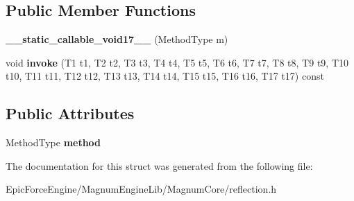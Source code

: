 \subsection*{Public Member Functions}
\begin{DoxyCompactItemize}
\item 
{\bfseries \+\_\+\+\_\+static\+\_\+callable\+\_\+void17\+\_\+\+\_\+} (Method\+Type m)\hypertarget{structagm_1_1reflection_1_1____static__callable__void17_____a3cccfe71a7d105334abec663010df20a}{}\label{structagm_1_1reflection_1_1____static__callable__void17_____a3cccfe71a7d105334abec663010df20a}

\item 
void {\bfseries invoke} (T1 t1, T2 t2, T3 t3, T4 t4, T5 t5, T6 t6, T7 t7, T8 t8, T9 t9, T10 t10, T11 t11, T12 t12, T13 t13, T14 t14, T15 t15, T16 t16, T17 t17) const \hypertarget{structagm_1_1reflection_1_1____static__callable__void17_____a746df7f3254e482cb4a74265a91e80c7}{}\label{structagm_1_1reflection_1_1____static__callable__void17_____a746df7f3254e482cb4a74265a91e80c7}

\end{DoxyCompactItemize}
\subsection*{Public Attributes}
\begin{DoxyCompactItemize}
\item 
Method\+Type {\bfseries method}\hypertarget{structagm_1_1reflection_1_1____static__callable__void17_____adec60407394a1af3d850764330d2bedf}{}\label{structagm_1_1reflection_1_1____static__callable__void17_____adec60407394a1af3d850764330d2bedf}

\end{DoxyCompactItemize}


The documentation for this struct was generated from the following file\+:\begin{DoxyCompactItemize}
\item 
Epic\+Force\+Engine/\+Magnum\+Engine\+Lib/\+Magnum\+Core/reflection.\+h\end{DoxyCompactItemize}
